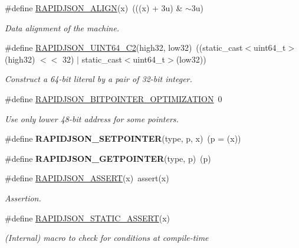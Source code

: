 \begin{DoxyCompactItemize}
\#define \hyperlink{a00636_ga583915242504c7fdb36e826f02f76242}{R\+A\+P\+I\+D\+J\+S\+O\+N\+\_\+\+A\+L\+I\+GN}(x)~(((x) + 3u) \& $\sim$3u)
\begin{DoxyCompactList}\small\item\em Data alignment of the machine. \end{DoxyCompactList}\item 
\#define \hyperlink{a00560_aaee1245f375a71be1ac9b8a07ba5fb8f}{R\+A\+P\+I\+D\+J\+S\+O\+N\+\_\+\+U\+I\+N\+T64\+\_\+\+C2}(high32,  low32)~((static\+\_\+cast$<$uint64\+\_\+t$>$(high32) $<$$<$ 32) $\vert$ static\+\_\+cast$<$uint64\+\_\+t$>$(low32))
\begin{DoxyCompactList}\small\item\em Construct a 64-\/bit literal by a pair of 32-\/bit integer. \end{DoxyCompactList}\item 
\#define \hyperlink{a00636_ga93fb983f78208d12c822376e1ea6d185}{R\+A\+P\+I\+D\+J\+S\+O\+N\+\_\+B\+I\+T\+P\+O\+I\+N\+T\+E\+R\+\_\+\+O\+P\+T\+I\+M\+I\+Z\+A\+T\+I\+ON}~0
\begin{DoxyCompactList}\small\item\em Use only lower 48-\/bit address for some pointers. \end{DoxyCompactList}\item 
\mbox{\label{a00560_a113598c4750b3aab4de2782ff1865ed4}} 
\#define {\bfseries R\+A\+P\+I\+D\+J\+S\+O\+N\+\_\+\+S\+E\+T\+P\+O\+I\+N\+T\+ER}(type,  p,  x)~(p = (x))
\item 
\mbox{\label{a00560_ab67ad54afdd78883907fd1ecd007573a}} 
\#define {\bfseries R\+A\+P\+I\+D\+J\+S\+O\+N\+\_\+\+G\+E\+T\+P\+O\+I\+N\+T\+ER}(type,  p)~(p)
\item 
\#define \hyperlink{a00636_gabeba18d612187bad2ac62aed9276d47c}{R\+A\+P\+I\+D\+J\+S\+O\+N\+\_\+\+A\+S\+S\+E\+RT}(x)~assert(x)
\begin{DoxyCompactList}\small\item\em Assertion. \end{DoxyCompactList}\item 
\#define \hyperlink{a00560_af95188da1d8eb6d4b148fe9ce71cd7c4}{R\+A\+P\+I\+D\+J\+S\+O\+N\+\_\+\+S\+T\+A\+T\+I\+C\+\_\+\+A\+S\+S\+E\+RT}(x)
\begin{DoxyCompactList}\small\item\em (Internal) macro to check for conditions at compile-\/time \end{DoxyCompactList}\item 
$$
\end{DoxyCompactItemize}
